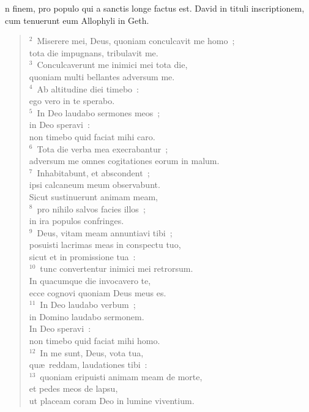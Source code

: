\bchapter[Psalm]
n finem, pro populo qui a sanctis longe factus est. David in tituli inscriptionem, cum tenuerunt eum Allophyli in Geth.
\begin{verse}${}^{2}$~Miserere mei, Deus, quoniam conculcavit me homo~;\\ tota die impugnans, tribulavit me.\\
${}^{3}$~Conculcaverunt me inimici mei tota die,\\ quoniam multi bellantes adversum me.\\
${}^{4}$~Ab altitudine diei timebo~:\\ ego vero in te sperabo.\\
${}^{5}$~In Deo laudabo sermones meos~;\\ in Deo speravi~:\\ non timebo quid faciat mihi caro.\\
${}^{6}$~Tota die verba mea execrabantur~;\\ adversum me omnes cogitationes eorum in malum.\\
${}^{7}$~Inhabitabunt, et abscondent~;\\ ipsi calcaneum meum observabunt.\\ Sicut sustinuerunt animam meam,\\
${}^{8}$~pro nihilo salvos facies illos~;\\ in ira populos confringes.\\
${}^{9}$~Deus, vitam meam annuntiavi tibi~;\\ posuisti lacrimas meas in conspectu tuo,\\ sicut et in promissione tua~:\\
${}^{10}$~tunc convertentur inimici mei retrorsum.\\ In quacumque die invocavero te,\\ ecce cognovi quoniam Deus meus es.\\
${}^{11}$~In Deo laudabo verbum~;\\ in Domino laudabo sermonem.\\ In Deo speravi~:\\ non timebo quid faciat mihi homo.\\
${}^{12}$~In me sunt, Deus, vota tua,\\ qu\ae\ reddam, laudationes tibi~:\\
${}^{13}$~quoniam eripuisti animam meam de morte,\\ et pedes meos de lapsu,\\ ut placeam coram Deo in lumine viventium.\end{verse}



